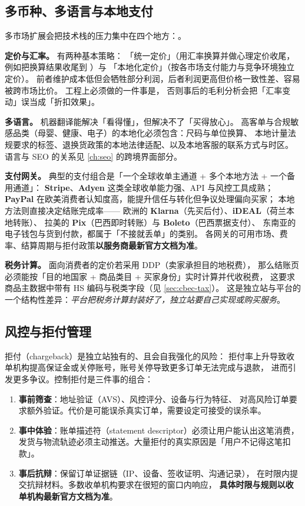 \subsection{多币种、多语言与本地支付}

多市场扩展会把技术栈的压力集中在四个地方：。

\textbf{定价与汇率。} 有两种基本策略：
「统一定价」（用汇率换算并做心理定价收尾，例如把换算结果收尾到 ）与
「本地化定价」（按各市场支付能力与竞争环境独立定价）。
前者维护成本低但会牺牲部分利润，后者利润更高但价格一致性差、容易被跨市场比价。
工程上必须做的一件事是，
否则事后的毛利分析会把「汇率变动」误当成「折扣效果」。

\textbf{多语言。} 机器翻译能解决「看得懂」，但解决不了「买得放心」。
高客单与合规敏感品类（母婴、健康、电子）的本地化必须包含：尺码与单位换算、
本地计量法规要求的标签、退换货政策的本地法律适配、以及本地客服的联系方式与时区。
语言与 SEO 的关系见 \cref{ch:seo} 的跨境界面部分。

\textbf{支付网关。} 典型的支付组合是「一个全球收单主通道 + 多个本地方法 + 一个备用通道」：
\textbf{Stripe}、\textbf{Adyen} 这类全球收单能力强、API 与风控工具成熟；
\textbf{PayPal} 在欧美消费者认知度高，能提升信任与转化但争议处理偏向买家；
本地方法则直接决定结账完成率——
欧洲的 \textbf{Klarna}（先买后付）、\textbf{iDEAL}（荷兰本地转账）、
拉美的 \textbf{Pix}（巴西即时转账）与 \textbf{Boleto}（巴西票据支付）、
东南亚的电子钱包与货到付款，都属于「不接就丢单」的类别。
各网关的可用市场、费率、结算周期与拒付政策\textbf{以服务商最新官方文档为准}。

\textbf{税务计算。} 面向消费者的定价若采用 DDP（卖家承担目的地税费），
那么结账页必须能按「目的地国家 + 商品类目 + 买家身份」实时计算并代收税费，
这要求商品主数据中带有 HS 编码与税类字段（见 \cref{sec:cbec-tax}）。
这是独立站与平台的一个结构性差异：\emph{平台把税务计算封装好了，独立站要自己实现或购买服务}。

\subsection{风控与拒付管理}

拒付（chargeback）是独立站独有的、且会自我强化的风险：
拒付率上升导致收单机构提高保证金或关停账号，账号关停导致更多订单无法完成与退款，
进而引发更多争议。控制拒付是三件事的组合：

\begin{enumerate}
  \item \textbf{事前筛查}：地址验证（AVS）、风控评分、设备与行为特征、
        对高风险订单要求额外验证。代价是可能误杀真实订单，需要设定可接受的误杀率。
  \item \textbf{事中体验}：账单描述符（statement descriptor）必须让用户能认出这笔消费，
        发货与物流轨迹必须主动推送。大量拒付的真实原因是「用户不记得这笔扣款」。
  \item \textbf{事后抗辩}：保留订单证据链（IP、设备、签收证明、沟通记录），
        在时限内提交抗辩材料。多数收单机构要求在很短的窗口内响应，
        \textbf{具体时限与规则以收单机构最新官方文档为准}。
\end{enumerate}

